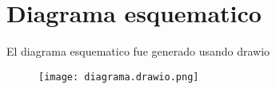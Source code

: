 \documentclass[../informe_krapp.tex]{subfiles}
\begin{document}
\section{Diagrama esquematico}
El diagrama esquematico fue generado usando drawio
\begin{figure}[H]
	\texttt{[image: diagrama.drawio.png]}
	\centering

\end{figure}
\end{document}

